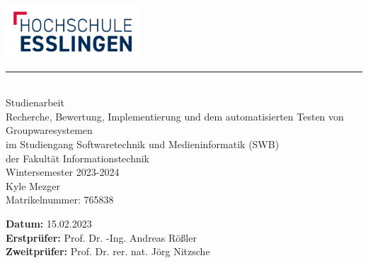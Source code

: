 \newcommand{\HRule}[2]{\noindent\rule[#1]{\linewidth}{#2}} %
\newcommand{\vlinespace}[1]{\vspace*{#1\baselineskip}} %
\newcommand{\titleemph}[1]{\textbf{#1}} %

\begin{titlepage}
 \sffamily %
      \hfill \includegraphics[width=5cm]{images/hslogo_small.png}
      \HRule{13pt}{1pt} 
   \centering
      \Large
      \vlinespace{3}\\
      Studienarbeit\\
      \huge
      Recherche, Bewertung, Implementierung und dem automatisierten Testen von Groupwaresystemen\\
%
      \Large
      \vlinespace{2}
          im Studiengang Softwaretechnik und Medieninformatik (SWB)\\
          der Fakultät Informationstechnik\\
%      
      Wintersemester 2023-2024\\
%     
      \vlinespace{2}
      Kyle Mezger\\
      Matrikelnummer: 765838
%
   \vfill
   \raggedright
%   
   \large
   \titleemph{Datum:} 15.02.2023 \\ %
   \titleemph{Erstprüfer:} Prof. Dr. -Ing. Andreas Rößler \\
   \titleemph{Zweitprüfer:} Prof. Dr. rer. nat. Jörg Nitzsche \\

\end{titlepage}
